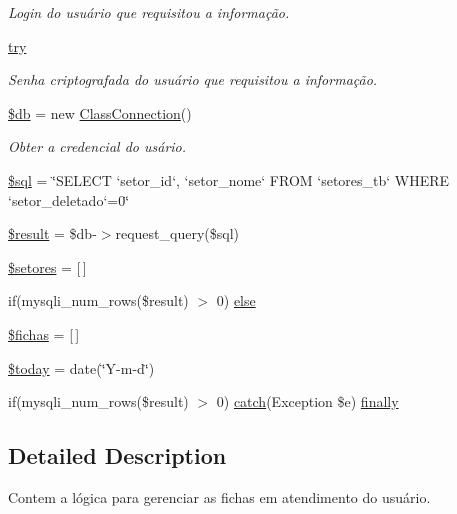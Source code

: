 \begin{DoxyCompactItemize}
\begin{DoxyCompactList}\small\item\em Login do usuário que requisitou a informação. \end{DoxyCompactList}\item 
\hyperlink{em_atendimento_8php_abe4cc9788f52e49485473dc699537388}{try}
\begin{DoxyCompactList}\small\item\em Senha criptografada do usuário que requisitou a informação. \end{DoxyCompactList}\item 
\hyperlink{em_atendimento_8php_a1fa3127fc82f96b1436d871ef02be319}{\$db} = new \hyperlink{class_class_connection}{Class\+Connection}()
\begin{DoxyCompactList}\small\item\em Obter a credencial do usário. \end{DoxyCompactList}\item 
\hyperlink{em_atendimento_8php_a047170d6020a882807665812a27e2525}{\$sql} = \char`\"{}S\+E\+L\+E\+CT `setor\+\_\+id`, `setor\+\_\+nome` F\+R\+OM `setores\+\_\+tb` W\+H\+E\+RE `setor\+\_\+deletado`=0\char`\"{}
\item 
\hyperlink{em_atendimento_8php_a112ef069ddc0454086e3d1e6d8d55d07}{\$result} = \$db-\/$>$request\+\_\+query(\$sql)
\item 
\hyperlink{em_atendimento_8php_af62a556436f10f703431108a1a8fc00f}{\$setores} = \mbox{[}$\,$\mbox{]}
\item 
if(mysqli\+\_\+num\+\_\+rows(\$result) $>$ 0) \hyperlink{em_atendimento_8php_aabe0fce4e8f9f822b09141ab57d918d9}{else}
\item 
\hyperlink{em_atendimento_8php_a70fe158d19ec254a3949e1d105ffe4ed}{\$fichas} = \mbox{[}$\,$\mbox{]}
\item 
\hyperlink{em_atendimento_8php_af1b7fb9d06cdc6d22c14741fc3cc185a}{\$today} = date(\char`\"{}Y-\/m-\/d\char`\"{})
\item 
if(mysqli\+\_\+num\+\_\+rows(\$result) $>$ 0) \hyperlink{imprimir_2ficha_2index_8php_a8104793004944f01dd070fc8b1ade3c4}{catch}(Exception \$e) \hyperlink{em_atendimento_8php_af7cfe1f8cb9dba05c425311a444e3fb4}{finally}
\end{DoxyCompactItemize}


\subsection{Detailed Description}
Contem a lógica para gerenciar as fichas em atendimento do usuário. 

